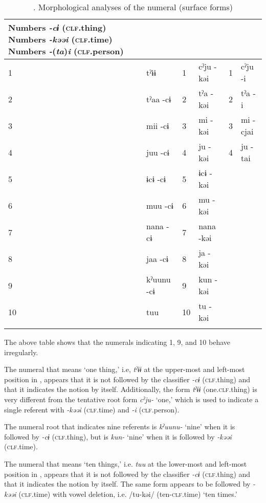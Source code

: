 \begin{table}
\caption{\label{tab:key:50}. Morphological analyses of the numeral (surface forms)}
\begin{tabular}{ll ll ll}
Numbers  \textit{{}-cɨ} (\textsc{clf}.thing)    Numbers  \textit{{}-kəəi} (\textsc{clf}.time)    Numbers  \textit{{}-}(\textit{ta})\textit{i} (\textsc{clf}.person)\\
\midrule
1  &tˀɨɨ          &  1 & cˀju  {}-kəi& 1  &  cˀju  {}-i\\
2  &tˀaa    {}-cɨ &  2 & tˀa  {}-kəi & 2  & tˀa  {}-i  \\
3  &mii    {}-cɨ  &  3 & mi  {}-kəi  & 3  & mi  {}-cjai \\
4  &juu    {}-cɨ  &  4 & ju  {}-kəi  & 4  & ju  {}-tai  \\
5  &ɨcɨ    {}-cɨ  &  5 & ɨcɨ  {}-kəi &    &            \\
6  &muu    {}-cɨ  &  6 & mu  {}-kəi  &    &            \\
7  &nana    {}-cɨ &  7 & nana  {}-kəi&    &            \\
8  &jaa    {}-cɨ  &  8 & ja  {}-kəi  &    &            \\
9  &kˀuunu {}-cɨ  &  9 & kun  {}-kəi &    &            \\
10 & tuu          & 10 & tu  {}-kəi  &    &            \\
\lspbottomrule
\end{tabular}
\end{table}

 The above table shows that the numerals indicating 1, 9, and 10 behave irregularly.

 The numeral that means ‘one thing,’ i.e, \textit{tˀɨɨ} at the upper-most and left-most position in , appears that it is not followed by the classifier \textit{{}-cɨ} (\textsc{clf}.thing) and that it indicates the notion by itself. Additionally, the form \textit{tˀɨɨ} (one.\textsc{clf}.thing) is very different from the tentative root form \textit{cˀju-} ‘one,’ which is used to indicate a single referent with \textit{-kəəi} (\textsc{clf}.time) and \textit{{}-i} (\textsc{clf}.person).

 The numeral root that indicates nine referents is \textit{kˀuunu-} ‘nine’ when it is followed by \textit{{}-cɨ} (\textsc{clf}.thing), but is \textit{kun-} ‘nine’ when it is followed by \textit{{}-kəəi} (\textsc{clf}.time).

The numeral that means ‘ten things,’ i.e. \textit{tuu} at the lower-most and left-most position in , appears that it is not followed by the classifier \textit{{}-cɨ} (\textsc{clf}.thing) and that it indicates the notion by itself. The same form appears to be followed by \textit{{}-kəəi} (\textsc{clf}.time) with vowel deletion, i.e. /tu-kəi/ (ten-\textsc{clf}.time) ‘ten times.’


